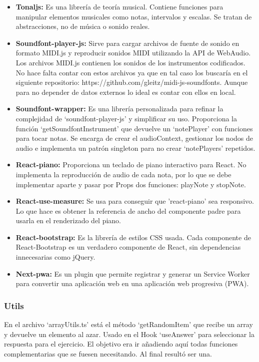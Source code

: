 \documentclass[12pt,twoside,titlepage]{report}
\begin{document}
\begin{itemize}
    \item \textbf{Tonaljs:} Es una librería de teoría musical. Contiene funciones para manipular elementos musicales como notas, intervalos y escalas. Se tratan de abstracciones, no de música o sonido reales.
    \item \textbf{Soundfont-player-js:} Sirve para cargar archivos de fuente de sonido en formato MIDI.js y reproducir sonidos MIDI utilizando la API de WebAudio. Los archivos MIDI.js contienen los sonidos de los instrumentos codificados. No hace falta contar con estos archivos ya que en tal caso los buscaría en el siguiente repositorio: https://github.com/gleitz/midi-js-soundfonts. Aunque para no depender de datos externos lo ideal es contar con ellos en local.
    \item \textbf{Soundfont-wrapper:} Es una librería personalizada para refinar la complejidad de ‘soundfont-player-js’ y simplificar su uso. Proporciona la función ‘getSoundfontInstrument’ que devuelve un ‘notePlayer’ con funciones para tocar notas. Se encarga de crear el audioContext, gestionar los nodos de audio e implementa un patrón singleton para no crear ‘notePlayers’ repetidos.
    \item \textbf{React-piano:} Proporciona un teclado de piano interactivo para React. No implementa la reproducción de audio de cada nota, por lo que se debe implementar aparte y pasar por Props dos funciones: playNote y stopNote.
    \item \textbf{React-use-measure:} Se usa para conseguir que ’react-piano’ sea responsivo. Lo que hace es obtener la referencia de ancho del componente padre para usarla en el renderizado del piano.
    \item \textbf{React-bootstrap:} Es la librería de estilos CSS usada. Cada componente de React-Bootstrap es un verdadero componente de React, sin dependencias innecesarias como jQuery.
    \item \textbf{Next-pwa:} Es un plugin que permite registrar y generar un Service Worker para convertir una aplicación web en una aplicación web progresiva (PWA).
\end{itemize}

\subsubsection{Utils}
En el archivo ‘arrayUtils.ts’ está el método ‘getRandomItem’ que recibe un array y devuelve un elemento al azar. Usado en el Hook ‘useAnswer’ para seleccionar la respuesta para el ejercicio. El objetivo era ir añadiendo aquí todas funciones complementarias que se fuesen necesitando. Al final resultó ser una.
\end{document}
